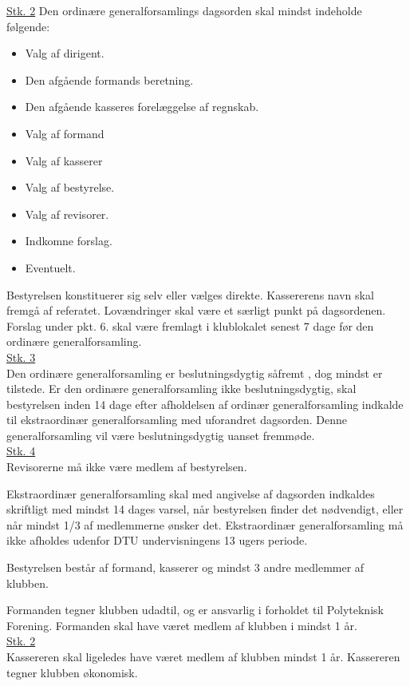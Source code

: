 \begin{list}
\underline{Stk. 2} Den ordinære generalforsamlings dagsorden skal mindst indeholde følgende:
\begin{itemize}
\item Valg af dirigent.
\item Den afgående formands beretning.
\item Den afgående kasseres forelæggelse af regnskab.
\item Valg af formand
\item Valg af kasserer
\item Valg af bestyrelse.
\item Valg af revisorer.
\item Indkomne forslag.
\item Eventuelt.
\end{itemize}
Bestyrelsen konstituerer sig selv eller vælges direkte. Kassererens navn skal fremgå af referatet. Lovændringer skal være et særligt punkt på dagsordenen. Forslag under pkt. 6. skal være fremlagt i klublokalet senest 7 dage før den ordinære generalforsamling.\\

\underline{Stk. 3}\\
Den ordinære generalforsamling er beslutningsdygtig såfremt \makebox[0.4in]{\hrulefill}, dog mindst \makebox[0.4in]{\hrulefill} er tilstede. Er den ordinære generalforsamling ikke beslutningsdygtig, skal bestyrelsen inden 14 dage efter afholdelsen af ordinær generalforsamling indkalde til ekstraordinær generalforsamling med uforandret dagsorden. Denne generalforsamling vil være beslutningsdygtig uanset fremmøde.\\

\underline{Stk. 4}\\
Revisorerne må ikke være medlem af bestyrelsen.
\item Ekstraordinær generalforsamling skal med angivelse af dagsorden indkaldes skriftligt med mindst 14 dages varsel, når bestyrelsen finder det nødvendigt, eller når mindst 1/3 af medlemmerne ønsker det. Ekstraordinær generalforsamling må ikke afholdes udenfor DTU undervisningens 13 ugers periode.
\item Bestyrelsen består af formand, kasserer og mindst 3 andre medlemmer af klubben.
\item Formanden tegner klubben udadtil, og er ansvarlig i forholdet til Polyteknisk Forening. Formanden skal have været medlem af klubben i mindst 1 år.\\

\underline{Stk. 2}\\
Kassereren skal ligeledes have været medlem af klubben mindst 1 år. Kassereren tegner klubben økonomisk.\\


\end{list}
